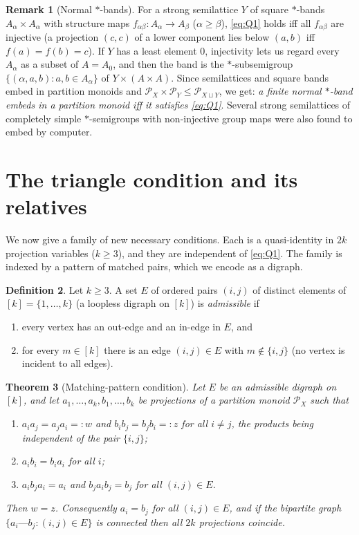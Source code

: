 \documentclass[11pt]{amsart}
\newtheorem{theorem}{Theorem}[section]
\theoremstyle{definition}
\newtheorem{definition}[theorem]{Definition}
\newtheorem{remark}[theorem]{Remark}
\renewcommand{\P}{\mathcal{P}}
\begin{document}
\begin{remark}[Normal $*$-bands]\label{rem:normal}
For a strong semilattice $Y$ of square $*$-bands $A_\alpha\times A_\alpha$ with structure maps $f_{\alpha\beta}\colon A_\alpha\to A_\beta$ ($\alpha\ge\beta$), \eqref{eq:Q1} holds iff all $f_{\alpha\beta}$ are injective (a projection $(c,c)$ of a lower component lies below $(a,b)$ iff $f(a)=f(b)=c$). If $Y$ has a least element $0$, injectivity lets us regard every $A_\alpha$ as a subset of $A=A_0$, and then the band is the $*$-subsemigroup $\{(\alpha,a,b): a,b\in A_\alpha\}$ of $Y\times(A\times A)$. Since semilattices and square bands embed in partition monoids and $\P_X\times\P_Y\le\P_{X\sqcup Y}$, we get: \emph{a finite normal $*$-band embeds in a partition monoid iff it satisfies \eqref{eq:Q1}}. Several strong semilattices of completely simple $*$-semigroups with non-injective group maps were also found to embed by computer.
\end{remark}

\section{The triangle condition and its relatives}\label{sec:hex}

We now give a family of new necessary conditions. Each is a quasi-identity in $2k$ projection variables ($k\ge3$), and they are independent of \eqref{eq:Q1}. The family is indexed by a pattern of matched pairs, which we encode as a digraph.

\begin{definition}
Let $k\ge3$. A set $E$ of ordered pairs $(i,j)$ of distinct elements of $[k]=\{1,\dots,k\}$ (a loopless digraph on $[k]$) is \emph{admissible} if
\begin{enumerate}[label=\textup{(\roman*)},nosep]
\item every vertex has an out-edge and an in-edge in $E$, and
\item for every $m\in[k]$ there is an edge $(i,j)\in E$ with $m\notin\{i,j\}$ (no vertex is incident to all edges).
\end{enumerate}
\end{definition}

\begin{theorem}[Matching-pattern condition]\label{thm:hex}
Let $E$ be an admissible digraph on $[k]$, and let $a_1,\dots,a_k,b_1,\dots,b_k$ be projections of a partition monoid $\P_X$ such that
\begin{enumerate}[label=\textup{(H\arabic*)},leftmargin=3em]
\item $a_ia_j=a_ja_i=:w$ and $b_ib_j=b_jb_i=:z$ for all $i\ne j$, the products being independent of the pair $\{i,j\}$;
\item $a_ib_i=b_ia_i$ for all $i$;
\item $a_ib_ja_i=a_i$ and $b_ja_ib_j=b_j$ for all $(i,j)\in E$.
\end{enumerate}
Then $w=z$. Consequently $a_i=b_j$ for all $(i,j)\in E$, and if the bipartite graph $\{a_i\text{---}b_j:(i,j)\in E\}$ is connected then all $2k$ projections coincide.
\end{theorem}
\end{document}

